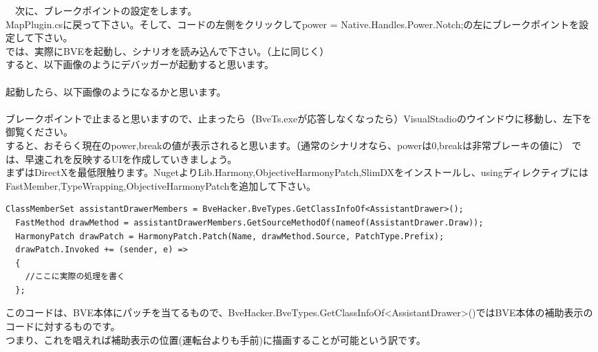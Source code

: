 \documentclass[b5paper,9pt,platex,dvipdfmx]{jsarticle}
\begin{document}
\begin{multicols*}{3}
　次に、ブレークポイントの設定をします。\\
MapPlugin.csに戻って下さい。そして、コードの左側をクリックしてpower = Native.Handles.Power.Notch;の左にブレークポイントを設定して下さい。\\
では、実際にBVEを起動し、シナリオを読み込んで下さい。（上に同じく）\\
すると、以下画像のようにデバッガーが起動すると思います。\\
\\
起動したら、以下画像のようになるかと思います。\\
\\
ブレークポイントで止まると思いますので、止まったら（BveTs.exeが応答しなくなったら）VisualStadioのウインドウに移動し、左下を御覧ください。\\
すると、おそらく現在のpower,breakの値が表示されると思います。（通常のシナリオなら、powerは0,breakは非常ブレーキの値に）
では、早速これを反映するUIを作成していきましょう。\\
まずはDirectXを最低限触ります。NugetよりLib.Harmony,ObjectiveHarmonyPatch,SlimDXをインストールし、usingディレクティブにはFastMember,TypeWrapping,ObjectiveHarmonyPatchを追加して下さい。\\
\begin{lstlisting}[caption= MapPluginMain()]
  ClassMemberSet assistantDrawerMembers = BveHacker.BveTypes.GetClassInfoOf<AssistantDrawer>();
  FastMethod drawMethod = assistantDrawerMembers.GetSourceMethodOf(nameof(AssistantDrawer.Draw));
  HarmonyPatch drawPatch = HarmonyPatch.Patch(Name, drawMethod.Source, PatchType.Prefix);
  drawPatch.Invoked += (sender, e) =>
  {
    //ここに実際の処理を書く
  };
\end{lstlisting}
このコードは、BVE本体にパッチを当てるもので、BveHacker.BveTypes.GetClassInfoOf<AssistantDrawer>()ではBVE本体の補助表示のコードに対するものです。\\
つまり、これを唱えれば補助表示の位置(運転台よりも手前)に描画することが可能という訳です。\\





\end{multicols*}
\end{document}
